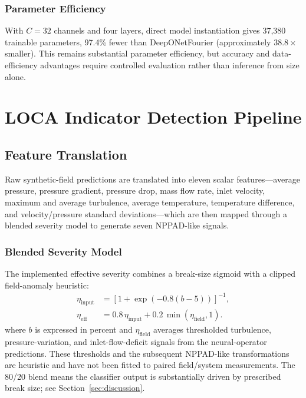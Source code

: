 \documentclass[journal]{IEEEtran}
\newcommand{\added}[1]{#1}
\begin{document}
\subsubsection{Parameter Efficiency}
With $C=32$ channels and four layers, direct model instantiation gives \added{37,380 trainable parameters, 97.4\% fewer than DeepONetFourier (approximately $38.8\times$ smaller)}. This remains substantial parameter efficiency, but accuracy and data-efficiency advantages require controlled evaluation rather than inference from size alone.

\section{LOCA Indicator Detection Pipeline}
\label{sec:pipeline}

\subsection{Feature Translation}

Raw synthetic-field predictions are translated into eleven scalar features---average pressure, pressure gradient, pressure drop, mass flow rate, inlet velocity, maximum and average turbulence, average temperature, temperature difference, and velocity/pressure standard deviations---which are then mapped through a blended severity model to generate seven NPPAD-like signals.

\subsubsection{Blended Severity Model}
\added{The implemented effective severity combines a break-size sigmoid with a clipped field-anomaly heuristic:}
 {
\begin{equation}
\begin{aligned}
\eta_\text{input}
  &=\left[1+\exp\!\left(-0.8(b-5)\right)\right]^{-1},\\
\eta_\text{eff}
  &=0.8\,\eta_\text{input}+0.2\,\min(\eta_\text{field},1).
\end{aligned}
\label{eq:severity}
\end{equation}}
\added{where $b$ is expressed in percent and $\eta_\text{field}$ averages thresholded turbulence, pressure-variation, and inlet-flow-deficit signals from the neural-operator predictions. These thresholds and the subsequent NPPAD-like transformations are heuristic and have not been fitted to paired field/system measurements. The 80/20 blend means the classifier output is substantially driven by prescribed break size; see Section~\ref{sec:discussion}.}
\end{document}
